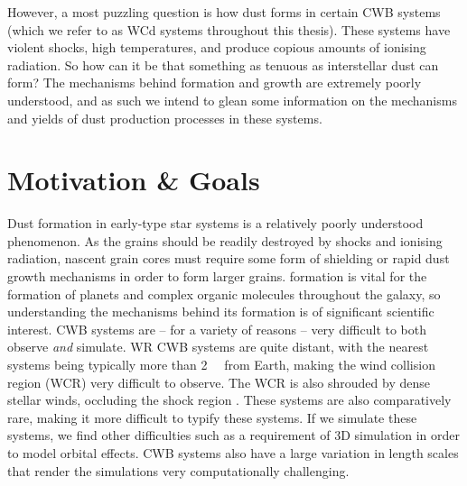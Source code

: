 However, a most puzzling question is how dust forms in certain CWB systems (which we refer to as WCd systems throughout this thesis).
These systems have violent shocks, high temperatures, and produce copious amounts of ionising radiation.
So how can it be that something as tenuous as interstellar dust can form?
The mechanisms behind formation and growth are extremely poorly understood, and as such we intend to glean some information on the mechanisms and yields of dust production processes in these systems.

\section{Motivation \& Goals}
\label{sec:projectgoals}

Dust formation in early-type star systems is a relatively poorly understood phenomenon.
As the grains should be readily destroyed by shocks and ionising radiation, nascent grain cores must require some form of shielding or rapid dust growth mechanisms in order to form larger grains.
 formation is vital for the formation of planets and complex organic molecules throughout the galaxy, so understanding the mechanisms behind its formation is of significant scientific interest.
CWB systems are -- for a variety of reasons -- very difficult to both observe \emph{and} simulate.
WR CWB systems are quite distant, with the nearest systems being typically more than \SI{2}{\kilo\parsec} from Earth, making the wind collision region (WCR) very difficult to observe.
The WCR is also shrouded by dense stellar winds, occluding the shock region .
These systems are also comparatively rare, making it more difficult to typify these systems.
If we simulate these systems, we find other difficulties such as a requirement of 3D simulation in order to model orbital effects.
CWB systems also have a large variation in length scales that render the simulations very computationally challenging.

